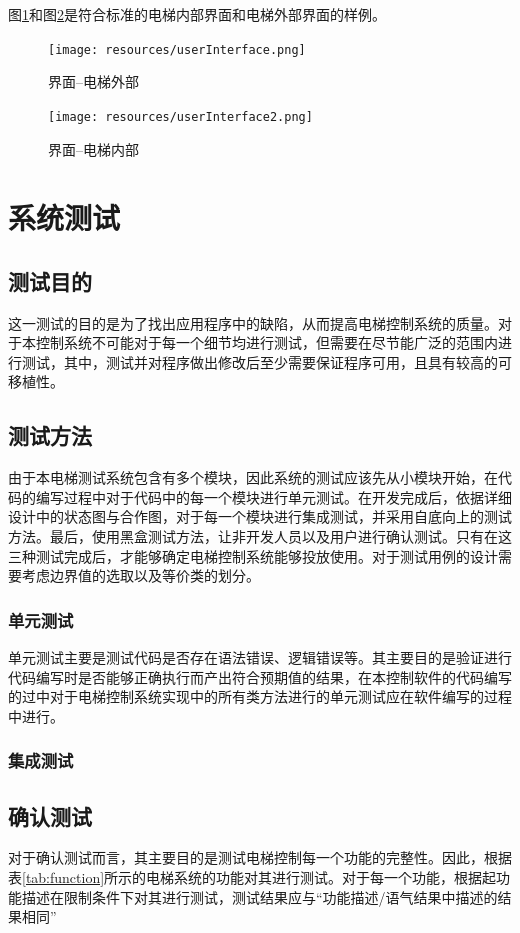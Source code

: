 图\ref{fig:userInterface}和图\ref{fig:userInterface2}是符合标准的电梯内部界面和电梯外部界面的样例。
\begin{figure}[H]
	\centering
	\texttt{[image: resources/userInterface.png]}
	\caption{界面--电梯外部}
	\label{fig:userInterface}
\end{figure}

\begin{figure}[H]
	\centering
	\texttt{[image: resources/userInterface2.png]}
	\caption{界面--电梯内部}
	\label{fig:userInterface2}
\end{figure}

\newpage
\section{系统测试}
\subsection{测试目的}
这一测试的目的是为了找出应用程序中的缺陷，从而提高电梯控制系统的质量。对于本控制系统不可能对于每一个细节均进行测试，但需要在尽节能广泛的范围内进行测试，其中，测试并对程序做出修改后至少需要保证程序可用，且具有较高的可移植性。

\subsection{测试方法}
由于本电梯测试系统包含有多个模块，因此系统的测试应该先从小模块开始，在代码的编写过程中对于代码中的每一个模块进行单元测试。在开发完成后，依据详细设计中的状态图与合作图，对于每一个模块进行集成测试，并采用自底向上的测试方法。最后，使用黑盒测试方法，让非开发人员以及用户进行确认测试。只有在这三种测试完成后，才能够确定电梯控制系统能够投放使用。对于测试用例的设计需要考虑边界值的选取以及等价类的划分。

\subsubsection{单元测试}
单元测试主要是测试代码是否存在语法错误、逻辑错误等。其主要目的是验证进行代码编写时是否能够正确执行而产出符合预期值的结果，在本控制软件的代码编写的过中对于电梯控制系统实现中的所有类方法进行的单元测试应在软件编写的过程中进行。

\subsubsection{集成测试}


\subsection{确认测试}
对于确认测试而言，其主要目的是测试电梯控制每一个功能的完整性。因此，根据表\ref{tab:function}所示的电梯系统的功能对其进行测试。对于每一个功能，根据起功能描述在限制条件下对其进行测试，测试结果应与``功能描述/语气结果中描述的结果相同''

